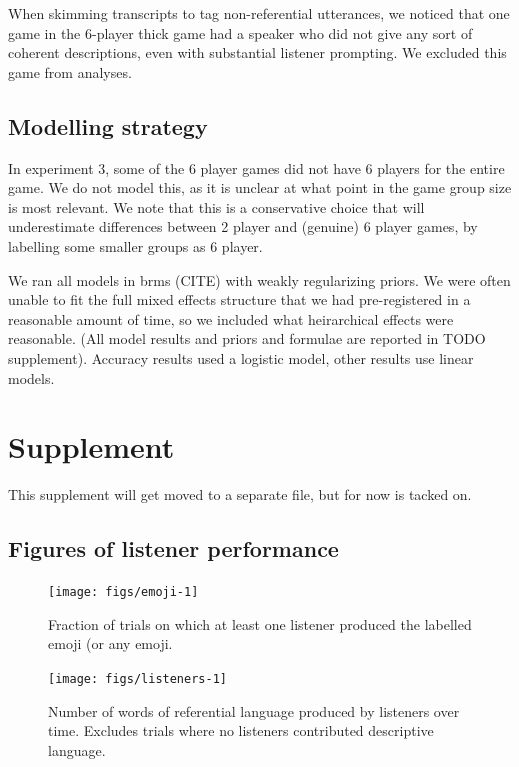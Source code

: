 \documentclass[
  english,
  a4paper,
]{article}
\begin{document}
When skimming transcripts to tag non-referential utterances, we noticed that one game in the 6-player thick game had a speaker who did not give any sort of coherent descriptions, even with substantial listener prompting. We excluded this game from analyses.

\hypertarget{modelling-strategy}{%
\subsection{Modelling strategy}\label{modelling-strategy}}

In experiment 3, some of the 6 player games did not have 6 players for the entire game. We do not model this, as it is unclear at what point in the game group size is most relevant. We note that this is a conservative choice that will underestimate differences between 2 player and (genuine) 6 player games, by labelling some smaller groups as 6 player.

We ran all models in brms (CITE) with weakly regularizing priors. We were often unable to fit the full mixed effects structure that we had pre-registered in a reasonable amount of time, so we included what heirarchical effects were reasonable. (All model results and priors and formulae are reported in TODO supplement). Accuracy results used a logistic model, other results use linear models.

\hypertarget{supplement}{%
\section{Supplement}\label{supplement}}

This supplement will get moved to a separate file, but for now is tacked on.

\hypertarget{figures-of-listener-performance}{%
\subsection{Figures of listener performance}\label{figures-of-listener-performance}}

\begin{figure}[t!]

{\centering \texttt{[image: figs/emoji-1]} 

}

\caption{Fraction of trials on which at least one listener produced the labelled emoji (or any emoji.}\label{fig:emoji}
\end{figure}

\begin{figure}[t!]

{\centering \texttt{[image: figs/listeners-1]} 

}

\caption{Number of words of referential language produced by listeners over time. Excludes trials where no listeners contributed descriptive language.  }\label{fig:listeners}
\end{figure}
\end{document}
